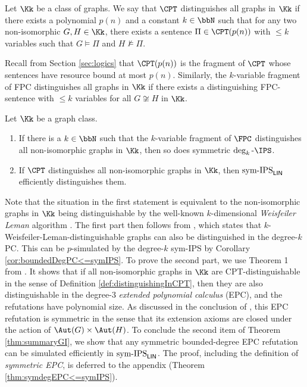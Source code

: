 \documentclass[a4paper,UKenglish,cleveref, autoref, thm-restate]{lipics-v2021}
\newcommand{\symIPSlin}{\text{ \upshape sym-IPS}_{\mathsf{LIN}}}
\begin{document}
\begin{definition}
	\label{def:distinguishingInCPT}
	Let $\Kk$ be a class of graphs. We say that $\CPT$ distinguishes all graphs in $\Kk$ if there exists a polynomial $p(n)$ and a constant $k \in \bbN$ such that for any two non-isomorphic $G, H \in \Kk$, there exists a sentence $\Pi \in \CPT(p(n))$ with $\leq k$ variables such that $G \models \Pi$ and $H \not\models \Pi$. 
\end{definition}	
Recall from Section \ref{sec:logics} that $\CPT(p(n))$ is the fragment of $\CPT$ whose sentences have resource bound at most $p(n)$.
Similarly, the $k$-variable fragment of FPC distinguishes all graphs in $\Kk$ if there exists a distinguishing FPC-sentence with $\leq k$ variables for all $G \not\cong H$ in $\Kk$.
\begin{theorem}
	\label{thm:summaryGI}
	Let $\Kk$ be a graph class. 
	\vspace{-0.2cm}
	\begin{enumerate}
		\item If there is a $k \in \bbN$ such that the $k$-variable fragment of $\FPC$ distinguishes all non-isomorphic graphs in $\Kk$, then so does symmetric $\deg_k\text{-}\IPS$.
		\item If $\CPT$ distinguishes all non-isomorphic graphs in $\Kk$, then$\symIPSlin$ efficiently distinguishes them.
	\end{enumerate}
\end{theorem}	
Note that the situation in the first statement is equivalent to the non-isomorphic graphs in $\Kk$ being distinguishable by the well-known $k$-dimensional \emph{Weisfeiler Leman} algorithm \cite{sandraSiglog}.
The first part then follows from \cite[Theorem 4.4]{GI}, which states that $k$-Weisfeiler-Leman-distinguishable graphs can also be distinguished in the degree-$k$ PC. This can be $p$-simulated by the degree-$k$ sym-IPS by Corollary \ref{cor:boundedDegPC<=symIPS}.
To prove the second part, we use Theorem 1 from \cite{Pago}. It shows that if all non-isomorphic graphs in $\Kk$ are CPT-distinguishable in the sense of Definition \ref{def:distinguishingInCPT}, then they are also distinguishable in the degree-$3$ \emph{extended polynomial calculus} (EPC), and the refutations have polynomial size. As discussed in the conclusion of \cite{Pago}, this EPC refutation is symmetric in the sense that its extension axioms are closed under the action of $\Aut(G) \times \Aut(H)$.
To conclude the second item of Theorem \ref{thm:summaryGI}, we show that any symmetric bounded-degree EPC refutation can be simulated efficiently in$\symIPSlin{}$. The proof, including the definition of \emph{symmetric EPC}, is deferred to the appendix (Theorem \ref{thm:symdegEPC<=symIPS}).
\end{document}
